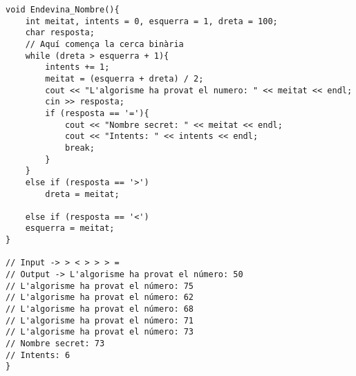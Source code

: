 \begin{lstlisting}
void Endevina_Nombre(){
    int meitat, intents = 0, esquerra = 1, dreta = 100;
    char resposta;
    // Aquí comença la cerca binària
    while (dreta > esquerra + 1){
        intents += 1;
        meitat = (esquerra + dreta) / 2;
        cout << "L'algorisme ha provat el numero: " << meitat << endl;
        cin >> resposta;
        if (resposta == '='){
            cout << "Nombre secret: " << meitat << endl;
            cout << "Intents: " << intents << endl;
            break;
        }
    } 
    else if (resposta == '>')
        dreta = meitat;
        
    else if (resposta == '<')
    esquerra = meitat;
}

// Input -> > < > > > =
// Output -> L'algorisme ha provat el número: 50
// L'algorisme ha provat el número: 75
// L'algorisme ha provat el número: 62
// L'algorisme ha provat el número: 68
// L'algorisme ha provat el número: 71
// L'algorisme ha provat el número: 73
// Nombre secret: 73
// Intents: 6
}
\end{lstlisting}